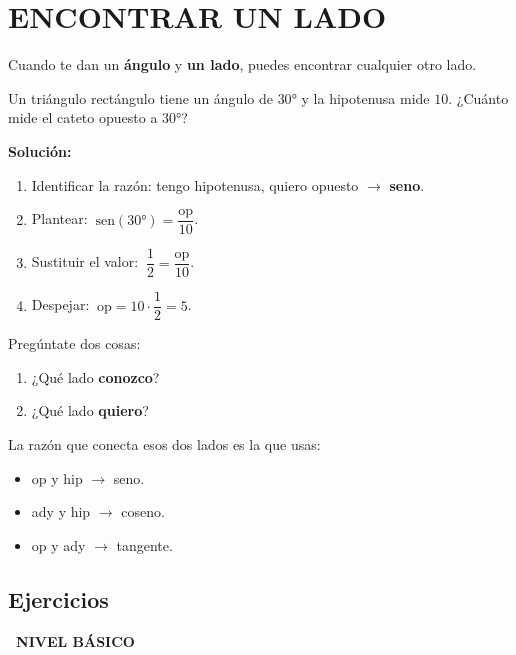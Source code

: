 \documentclass[11pt,a4paper]{article}
\newcommand{\nivelbasico}{%
  \par\smallskip\colorbox{green!60!black}{\color{white}\small\bfseries\ NIVEL BÁSICO\ }\par\smallskip}
\begin{document}
\newpage

\section{ENCONTRAR UN LADO}

Cuando te dan un \textbf{ángulo} y \textbf{un lado}, puedes encontrar cualquier otro lado.

\begin{tcolorbox}[ejemplo, title=Ejemplo 2]
Un triángulo rectángulo tiene un ángulo de $30°$ y la hipotenusa mide $10$. ¿Cuánto mide el cateto opuesto a $30°$?

\medskip
\textbf{Solución:}
\begin{enumerate}[nosep]
  \item Identificar la razón: tengo hipotenusa, quiero opuesto $\to$ \textbf{seno}.
  \item Plantear: $\ \mathrm{sen}(30°) = \dfrac{\text{op}}{10}$.
  \item Sustituir el valor: $\ \dfrac{1}{2} = \dfrac{\text{op}}{10}$.
  \item Despejar: $\ \text{op} = 10 \cdot \dfrac{1}{2} = 5$.
\end{enumerate}
\end{tcolorbox}

\begin{tcolorbox}[recuerda, title={\color{black} CÓMO ELEGIR LA RAZÓN}]
Pregúntate dos cosas:
\begin{enumerate}[nosep]
  \item ¿Qué lado \textbf{conozco}?
  \item ¿Qué lado \textbf{quiero}?
\end{enumerate}
La razón que conecta esos dos lados es la que usas:
\begin{itemize}[nosep]
  \item op y hip $\to$ seno.
  \item ady y hip $\to$ coseno.
  \item op y ady $\to$ tangente.
\end{itemize}
\end{tcolorbox}

\subsection*{Ejercicios}

\nivelbasico
\end{document}

